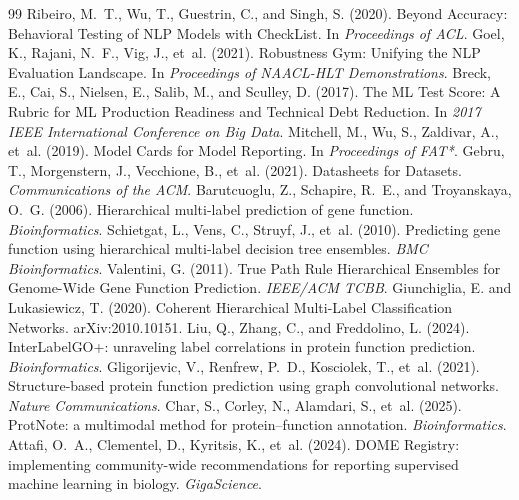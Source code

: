 \documentclass[11pt]{article}
\begin{document}
{\begin{thebibliography}{99}
 Ribeiro, M.~T., Wu, T., Guestrin, C., and Singh, S. (2020). Beyond Accuracy: Behavioral Testing of NLP Models with CheckList. In \emph{Proceedings of ACL}.
 Goel, K., Rajani, N.~F., Vig, J., et~al. (2021). Robustness Gym: Unifying the NLP Evaluation Landscape. In \emph{Proceedings of NAACL-HLT Demonstrations}.
 Breck, E., Cai, S., Nielsen, E., Salib, M., and Sculley, D. (2017). The ML Test Score: A Rubric for ML Production Readiness and Technical Debt Reduction. In \emph{2017 IEEE International Conference on Big Data}.
 Mitchell, M., Wu, S., Zaldivar, A., et~al. (2019). Model Cards for Model Reporting. In \emph{Proceedings of FAT*}.
 Gebru, T., Morgenstern, J., Vecchione, B., et~al. (2021). Datasheets for Datasets. \emph{Communications of the ACM}.
 Barutcuoglu, Z., Schapire, R.~E., and Troyanskaya, O.~G. (2006). Hierarchical multi-label prediction of gene function. \emph{Bioinformatics}.
 Schietgat, L., Vens, C., Struyf, J., et~al. (2010). Predicting gene function using hierarchical multi-label decision tree ensembles. \emph{BMC Bioinformatics}.
 Valentini, G. (2011). True Path Rule Hierarchical Ensembles for Genome-Wide Gene Function Prediction. \emph{IEEE/ACM TCBB}.
 Giunchiglia, E. and Lukasiewicz, T. (2020). Coherent Hierarchical Multi-Label Classification Networks. arXiv:2010.10151.
 Liu, Q., Zhang, C., and Freddolino, L. (2024). InterLabelGO+: unraveling label correlations in protein function prediction. \emph{Bioinformatics}.
 Gligorijevic, V., Renfrew, P.~D., Kosciolek, T., et~al. (2021). Structure-based protein function prediction using graph convolutional networks. \emph{Nature Communications}.
 Char, S., Corley, N., Alamdari, S., et~al. (2025). ProtNote: a multimodal method for protein--function annotation. \emph{Bioinformatics}.
 Attafi, O.~A., Clementel, D., Kyritsis, K., et~al. (2024). DOME Registry: implementing community-wide recommendations for reporting supervised machine learning in biology. \emph{GigaScience}.

\end{thebibliography}}
\end{document}
